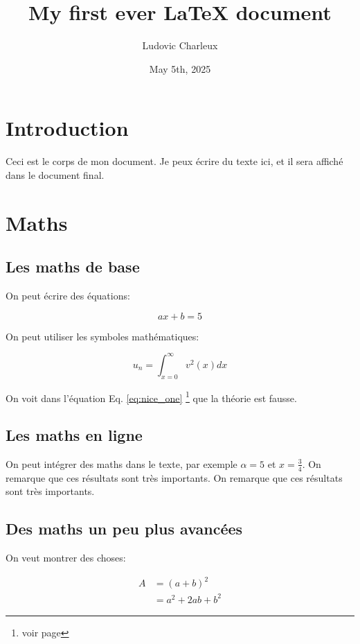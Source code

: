 \documentclass[10pt,a4paper,twoside]{article}
\author{Ludovic Charleux}
\title{My first ever LaTeX document}
\date{May 5th, 2025}
\begin{document}
\maketitle

\tableofcontents %

\section{Introduction}

Ceci est le corps de mon document.
Je peux écrire du texte ici, et il sera affiché dans le document final.

\blindtext[1]



\section{Maths}

\subsection{Les maths de base}

On peut écrire des équations:
\blindtext

$$
    a x + b = 5
$$

\noindent On peut utiliser les symboles mathématiques:

\begin{equation}
    u_n = \int_{x=0}^\infty v^2(x) dx
    \label{eq:nice_one}
\end{equation}

On voit dans l'équation Eq. \ref{eq:nice_one} \footnote{voir page \pageref{eq:nice_one}} que la théorie est fausse.

\subsection{Les maths en ligne}

On peut intégrer des maths dans le texte, par exemple $\alpha = 5$ et $x = \frac{3}{4}$.
On remarque que ces résultats sont très importants.
On remarque que ces résultats sont très importants.

\subsection{Des maths un peu plus avancées}

On veut montrer des choses:

\begin{align}
    A & = \left( a + b\right)^2 \nonumber \\
      & = a^2 + 2 ab + b^2
\end{align}
\end{document}
